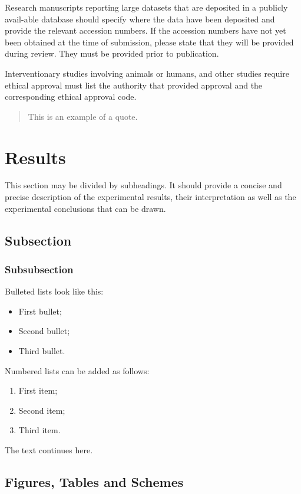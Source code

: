 \documentclass[entropy,article,submit,pdftex,moreauthors]{Definitions/mdpi}
\begin{document}
Research manuscripts reporting large datasets that are deposited in a publicly avail-able database should specify where the data have been deposited and provide the relevant accession numbers. If the accession numbers have not yet been obtained at the time of submission, please state that they will be provided during review. They must be provided prior to publication.

Interventionary studies involving animals or humans, and other studies require ethical approval must list the authority that provided approval and the corresponding ethical approval code.
\begin{quote}
This is an example of a quote.
\end{quote}

\section{Results}

This section may be divided by subheadings. It should provide a concise and precise description of the experimental results, their interpretation as well as the experimental conclusions that can be drawn.
\subsection{Subsection}
\subsubsection{Subsubsection}

Bulleted lists look like this:
\begin{itemize}
\item	First bullet;
\item	Second bullet;
\item	Third bullet.
\end{itemize}

Numbered lists can be added as follows:
\begin{enumerate}
\item	First item; 
\item	Second item;
\item	Third item.
\end{enumerate}

The text continues here. 

\subsection{Figures, Tables and Schemes}
\end{document}
